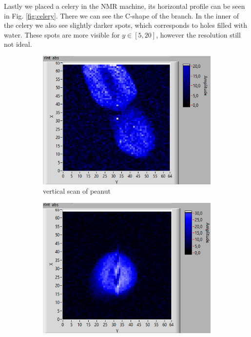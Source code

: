 Lastly we placed a celery in the NMR machine, its horizontal profile can be seen in Fig. \ref{fig:celery}. There we can see the C-shape of the branch. In the inner of the celery we also see slightly darker spots, which corresponds to holes filled with water. These spots are more visible for $y \in [5, 20]$, however the resolution still not ideal. 
\begin{figure}[ht]
    \centering
    \begin{subfigure}[b]{0.45\textwidth}
        \centering
        \includegraphics[width=\textwidth]{./Latex images/nut_airgap.png}
        \caption{ vertical scan of peanut}
        \label{fig:nut vertical}
    \end{subfigure}
    \hfill
    \begin{subfigure}[b]{0.45\textwidth}
        \centering
        \includegraphics[width=\textwidth]{./Latex images/nut_horizontal.png}

\end{subfigure}
\end{figure}
